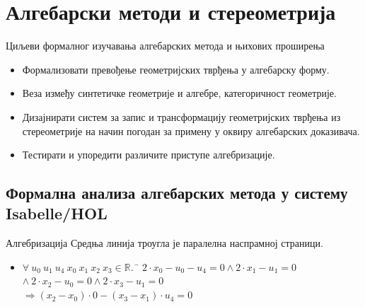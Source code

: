 \documentclass[slidestop, compress, mathserif, containsverbatim, xcolor=dvipsnames]{beamer}
\begin{document}
\section{Алгебарски методи и стереометрија}

\begin{frame}{Циљеви формалног изучавања алгебарских метода и њихових проширења}
  \begin{itemize}
  \item Формализовати превођење геометријских тврђења у алгебарску
    форму. \vfill
  \item Веза између синтетичке геометрије и алгебре, категоричност
    геометрије. \vfill
  \item Дизајнирати систем за запис и трансформацију геометријских
    тврђења из стереометрије на начин погодан за примену у оквиру
    алгебарских доказивача. \vfill
  \item Тестирати и упоредити различите приступе алгебризације.
  \end{itemize}
\end{frame}

\subsection*{Формална анализа алгебарских метода у систему Isabelle/HOL}

\begin{frame}[shrink]{Алгебризација}
  Средња линија троугла је паралелна наспрамној страници.
  \begin{center}
    
  \end{center}
  \begin{itemize}
  \item \begin{footnotesize} \begin{tabbing}
      $\forall\ u_0\ u_1\ u_4\ x_0\ x_1\ x_2\ x_3 \in \mathbb{R}.\ $ \= $2\cdot x_0 - u_0 - u_4 = 0 \land 2\cdot x_1 - u_1 = 0$ \\
      \> $\land\ 2\cdot x_2 - u_0 = 0 \land 2\cdot x_3 - u_1 = 0$ \\
      \> $\Longrightarrow (x_2 - x_0 ) \cdot 0 - (x_3 - x_1 )\cdot u_4 = 0$
  \end{tabbing} \end{footnotesize}
  \end{itemize}
\end{frame}
\end{document}
